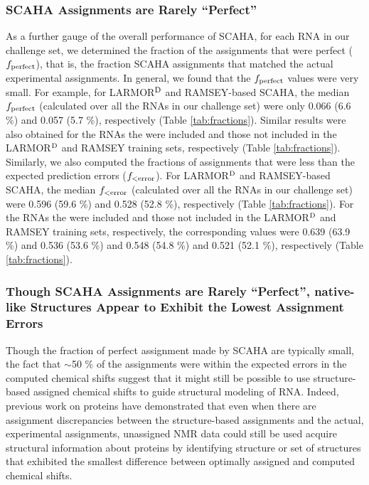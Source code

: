\documentclass[journal=jcisd8,manuscript=article,layout=onecolumn]{achemso}
\begin{document}
\subsubsection{SCAHA Assignments are Rarely ``Perfect''} 
As a further gauge of the overall performance of SCAHA, for each RNA in our challenge set, we determined the fraction of the assignments that were perfect ($f_{\rm perfect}$), that is, the fraction SCAHA assignments that matched the actual experimental assignments. In general, we found that the $f_{\rm perfect}$ values were very small.  For example, for LARMOR$^{\rm D}$ and RAMSEY-based SCAHA, the median $f_{\rm perfect}$ (calculated over all the RNAs in our challenge set) were only 0.066 (6.6 \%) and 0.057 (5.7 \%), respectively  (Table \ref{tab:fractions}). Similar results were also obtained for the RNAs the were included and those not included in the LARMOR$^{\rm D}$ and RAMSEY training sets, respectively (Table \ref{tab:fractions}). Similarly, we also computed the fractions of assignments that were less than the expected prediction errors ($f_{\rm < error}$). For LARMOR$^{\rm D}$ and RAMSEY-based SCAHA, the median $f_{\rm < error}$ (calculated over all the RNAs in our challenge set) were 0.596 (59.6 \%) and 0.528 (52.8 \%), respectively  (Table \ref{tab:fractions}). For the RNAs the were included and those not included in the LARMOR$^{\rm D}$ and RAMSEY training sets, respectively, the corresponding values were 0.639 (63.9 \%) and 0.536 (53.6 \%) and 0.548 (54.8 \%) and 0.521 (52.1 \%), respectively (Table \ref{tab:fractions}). 

\subsubsection{Though SCAHA Assignments are Rarely ``Perfect'',  native-like Structures Appear to Exhibit the Lowest Assignment Errors} 


Though the fraction of perfect assignment made by SCAHA are typically small, the fact that $\sim$50 \% of the assignments were within the expected errors  in the computed chemical shifts suggest that it  might still be possible to use structure-based assigned chemical shifts to guide structural modeling of RNA. Indeed, previous work on proteins have demonstrated that even when there are assignment discrepancies between the structure-based assignments and the actual, experimental assignments\cite{meiler2003rapid, bermejo2008deuterated, courtney2015experimental}, unassigned NMR data could still be used acquire structural information about proteins by identifying structure or set of structures that exhibited the smallest difference between optimally assigned and computed chemical shifts. 
\end{document}
